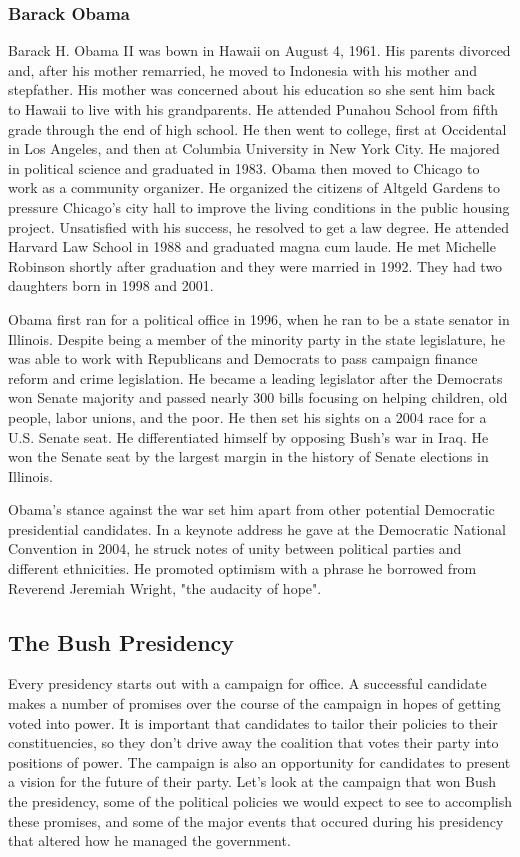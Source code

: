 \documentclass{article}
\begin{document}
        \subsubsection{Barack Obama}
        Barack H. Obama II was bown in Hawaii on August 4, 1961. His parents divorced and, after his mother remarried, he moved to Indonesia with his mother and stepfather. His mother was concerned about his education so she sent him back to Hawaii to live with his grandparents. He attended Punahou School from fifth grade through the end of high school. He then went to college, first at Occidental in Los Angeles, and then at Columbia University in New York City. He majored in political science and graduated in 1983. Obama then moved to Chicago to work as a community organizer. He organized the citizens of Altgeld Gardens to pressure Chicago's city hall to improve the living conditions in the public housing project. Unsatisfied with his success, he resolved to get a law degree. He attended Harvard Law School in 1988 and graduated magna cum laude. He met Michelle Robinson shortly after graduation and they were married in 1992. They had two daughters born in 1998 and 2001.\cite{obamahistory}
        \par
        Obama first ran for a political office in 1996, when he ran to be a state senator in Illinois. Despite being a member of the minority party in the state legislature, he was able to work with Republicans and Democrats to pass campaign finance reform and crime legislation. He became a leading legislator after the Democrats won Senate majority and passed nearly 300 bills focusing on helping children, old people, labor unions, and the poor. He then set his sights on a 2004 race for a U.S. Senate seat. He differentiated himself by opposing Bush's war in Iraq. He won the Senate seat by the largest margin in the history of Senate elections in Illinois.\cite{obamahistory}
        \par
        Obama's stance against the war set him apart from other potential Democratic presidential candidates. In a keynote address he gave at the Democratic National Convention in 2004, he struck notes of unity between political parties and different ethnicities. He promoted optimism with a phrase he borrowed from Reverend Jeremiah Wright, "the audacity of hope".\cite{obamahistory}

    \subsection{The Bush Presidency}
    Every presidency starts out with a campaign for office. A successful candidate makes a number of promises over the course of the campaign in hopes of getting voted into power. It is important that candidates to tailor their policies to their constituencies, so they don't drive away the coalition that votes their party into positions of power. The campaign is also an opportunity for candidates to present a vision for the future of their party. Let's look at the campaign that won Bush the presidency, some of the political policies we would expect to see to accomplish these promises, and some of the major events that occured during his presidency that altered how he managed the government.
\end{document}
